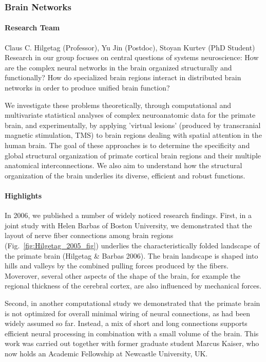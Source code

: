 \subsubsection{Brain Networks}

\paragraph{Research Team}
Claus C. Hilgetag (Professor), Yu Jin (Postdoc),  Stoyan Kurtev (PhD Student)\\


Research in our group focuses on central questions of systems neuroscience:
How are the complex neural networks in the brain organized structurally and functionally?  How do specialized brain regions interact in distributed brain networks in order to produce unified brain function?

We investigate these problems theoretically, through computational and multivariate
statistical analyses of complex neuroanatomic data for the primate brain, and experimentally,
by applying 'virtual lesions' (produced by transcranial magnetic stimulation, TMS) to brain
regions dealing with spatial attention in the human brain. The goal of these approaches is to determine the specificity and global structural organization of primate cortical brain regions and their multiple anatomical interconnections. We also aim to understand how the structural organization of the brain underlies its diverse, efficient and robust functions.


\paragraph{Highlights}
%
In 2006, we published a number of widely noticed research findings. First, in a joint study with Helen Barbas of Boston University, we demonstrated that the layout of nerve fiber connections among brain regions (Fig.~\ref{fig:Hilgetag_2005_fig}) underlies the characteristically folded landscape of the primate brain (Hilgetag \& Barbas 2006).  The brain landscape is shaped into hills and valleys by the combined pulling forces produced by the fibers.  Moverover, several other aspects of the shape of the brain, for example the regional thickness of the cerebral cortex, are also influenced by mechanical forces.

Second, in another computational study we demonstrated that the primate brain is not optimized for overall minimal wiring of neural connections, as had been widely assumed so far.  Instead, a mix of short and long connections supports efficient neural processing in combination with a small volume of the brain.  This work was carried out together with former graduate student Marcus Kaiser, who now holds an Academic Fellowship at Newcastle University, UK.

